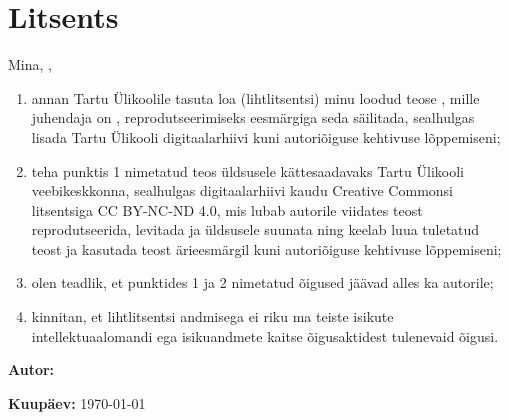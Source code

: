 \section*{Litsents}
\label{litsents}

\vspace{0.8cm}

Mina, \AuthorName, \newline

\begin{enumerate}
    \item annan Tartu Ülikoolile tasuta loa (lihtlitsentsi) minu loodud teose \ThesisTitle, mille juhendaja on \SupervisorName, reprodutseerimiseks eesmärgiga seda säilitada, sealhulgas lisada Tartu Ülikooli digitaalarhiivi kuni autoriõiguse kehtivuse lõppemiseni;
    
    \item teha punktis 1 nimetatud teos üldsusele kättesaadavaks Tartu Ülikooli veebikeskkonna, sealhulgas digitaalarhiivi kaudu Creative Commonsi litsentsiga CC BY-NC-ND 4.0, mis lubab autorile viidates teost reprodutseerida, levitada ja üldsusele suunata ning keelab luua tuletatud teost ja kasutada teost ärieesmärgil kuni autoriõiguse kehtivuse lõppemiseni;
    
    \item olen teadlik, et punktides 1 ja 2 nimetatud õigused jäävad alles ka autorile;
    
    \item kinnitan, et lihtlitsentsi andmisega ei riku ma teiste isikute intellektuaalomandi ega isikuandmete kaitse õigusaktidest tulenevaid õigusi.
\end{enumerate}

\vspace{1.5cm}

\noindent\textbf{Autor:} \AuthorName

\vspace{0.8cm}

\noindent\textbf{Kuupäev:} \today